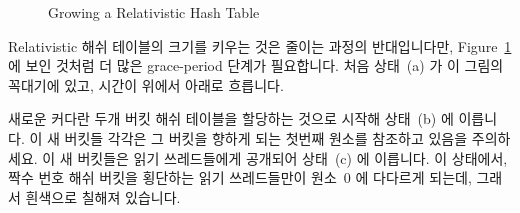 \begin{figure}[tb]
\centering
{}
\caption{Growing a Relativistic Hash Table}
\label{fig:datastruct:Growing a Relativistic Hash Table}
\end{figure}

Relativistic 해쉬 테이블의 크기를 키우는 것은 줄이는 과정의 반대입니다만,
Figure~\ref{fig:datastruct:Growing a Relativistic Hash Table} 에 보인 것처럼 더
많은 grace-period 단계가 필요합니다.
처음 상태~(a) 가 이 그림의 꼭대기에 있고, 시간이 위에서 아래로 흐릅니다.

새로운 커다란 두개 버킷 해쉬 테이블을 할당하는 것으로 시작해 상태~(b) 에
이릅니다.
이 새 버킷들 각각은 그 버킷을 향하게 되는 첫번째 원소를 참조하고 있음을
주의하세요.
이 새 버킷들은 읽기 쓰레드들에게 공개되어 상태~(c) 에 이릅니다.
이 상태에서, 짝수 번호 해쉬 버킷을 횡단하는 읽기 쓰레드들만이 원소~0 에
다다르게 되는데, 그래서 흰색으로 칠해져 있습니다.


